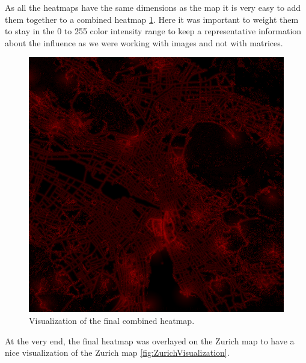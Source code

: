 \documentclass[letterpaper]{article}
\begin{document}
\indent As all the heatmaps have the same dimensions as the map it is very easy to add them together to a combined heatmap \ref{fig:ZurichAllHeatmaps}. Here it was important to weight them to stay in the 0 to 255 color intensity range to keep a representative information about the influence as we were working with images and not with matrices. 

\begin{figure}
    \centering
     \includegraphics[width=.95\linewidth]{images/combined_heatmap_all.png}
    \caption{Visualization of the final combined heatmap.}
    \label{fig:ZurichAllHeatmaps}
\end{figure}

\indent At the very end, the final heatmap was overlayed on the Zurich map to have a nice visualization of the Zurich map \ref{fig:ZurichVisualization}.
\end{document}
